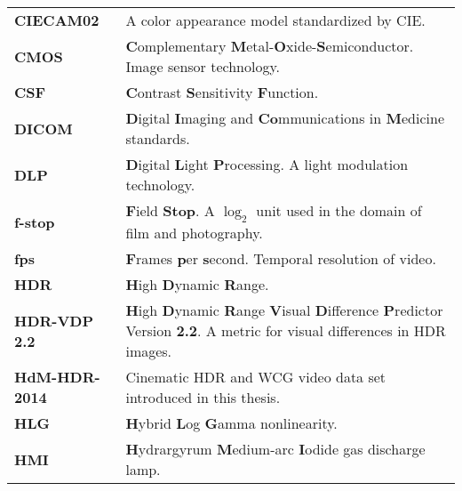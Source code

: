 \begin{flushleft}
\begin{longtable}[c]{@{}p{28.5mm}@{} p{120.5mm}}
	\textbf{CIECAM02}	& A color appearance model standardized by CIE.\\
	\textbf{CMOS}	& \textbf{C}omplementary \textbf{M}etal-\textbf{O}xide-\textbf{S}emiconductor. Image sensor technology.\\
	\textbf{CSF}	& \textbf{C}ontrast \textbf{S}ensitivity \textbf{F}unction.\\
	\textbf{DICOM}	& \textbf{D}igital \textbf{I}maging and \textbf{Co}mmunications in \textbf{M}edicine standards.\\
	\textbf{DLP}	& \textbf{D}igital \textbf{L}ight \textbf{P}rocessing. A light modulation technology.\\	
	\textbf{f-stop}	& \textbf{F}ield \textbf{Stop}. A $\log_2$ unit used in the domain of film and photography.\\
	\textbf{fps}	& \textbf{F}rames \textbf{p}er \textbf{s}econd. Temporal resolution of video.\\
	\textbf{HDR}	& \textbf{H}igh \textbf{D}ynamic \textbf{R}ange.\\ 
	\textbf{HDR-VDP 2.2}	& \textbf{H}igh \textbf{D}ynamic \textbf{R}ange \textbf{V}isual \textbf{D}ifference \textbf{P}redictor Version \textbf{2.2}. A metric for visual differences in HDR images.\\
	\textbf{HdM-HDR-2014}	& Cinematic HDR and WCG video data set introduced in this thesis.\\
	\textbf{HLG}	& \textbf{H}ybrid \textbf{L}og \textbf{G}amma nonlinearity.\\
	\textbf{HMI}	& \textbf{H}ydrargyrum \textbf{M}edium-arc \textbf{I}odide gas discharge lamp.\\

\end{longtable}
\end{flushleft}
